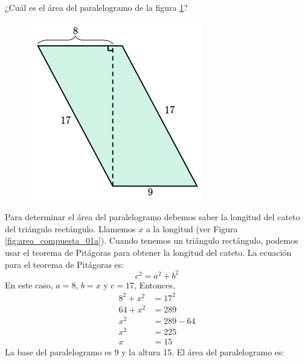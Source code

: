 ¿Cuál es el \'area del paralelogramo de la figura \ref{fig:area_compuesta_01}?

\begin{figure}[H]
    \begin{center}
        \includegraphics[width=0.25\linewidth]{../images/area_compuesta_01.png}
    \end{center}
    \caption{}
    \label{fig:area_compuesta_01}
\end{figure}
\begin{solutionbox}{13cm}

    \begin{minipage}{0.6\textwidth}
        Para determinar el área del paralelogramo debemos saber la longitud del cateto del triángulo rectángulo. Llamemos $x$ a la longitud (ver Figura \ref{fig:area_compuesta_01a}).
        Cuando tenemos un triángulo rectángulo, podemos usar el teorema de Pitágoras para obtener la longitud del cateto.
        La ecuación para el teorema de Pitágoras es:
        \[c^2=a^2+b^2\]
        En este caso, $a=8$, $b=x$ y $c=17$, Entonces,
        \begin{align*}
            8^2+x^2 & =17^2   \\
            64+x^2  & =289    \\
            x^2     & =289-64 \\
            x^2     & =225    \\
            x       & =15
        \end{align*}
        La base del paralelogramo es 9 y la altura 15. El área del paralelogramo es:


\end{minipage}
\end{solutionbox}
